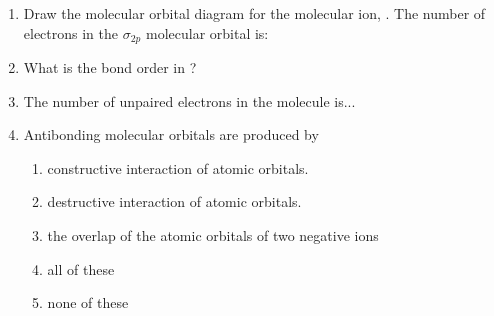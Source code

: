 \documentclass[main.tex]{subfiles}
\begin{document}
\begin{fullwidth}
\begin{multicols*}{2}
\begin{enumerate}
\item Draw the molecular orbital diagram for the molecular ion, . The number of electrons in the $\sigma_{2p}$ molecular orbital is:
\begin{enumerate}[label=(\alph*)]\vspace{-0.5cm}
\end{enumerate}\vspace{-0.5cm}
		
\item What is the bond order in ?
\begin{enumerate}[label=(\alph*)]\vspace{-0.5cm}
\end{enumerate}\vspace{-0.5cm}

		
\item The number of unpaired electrons in the  molecule is...
\begin{enumerate}[label=(\alph*)]\vspace{-0.5cm}
\end{enumerate}\vspace{-0.5cm}

		
\item Antibonding molecular orbitals are produced by
\begin{enumerate}[label=(\alph*)] 

\item  constructive interaction of atomic orbitals.
\item  destructive interaction of atomic orbitals.
\item  the overlap of the atomic orbitals of two negative ions
\item  all of these
\item  none of these
 \end{enumerate} 


\end{enumerate}
\end{multicols*}
\end{fullwidth}
\end{document}
